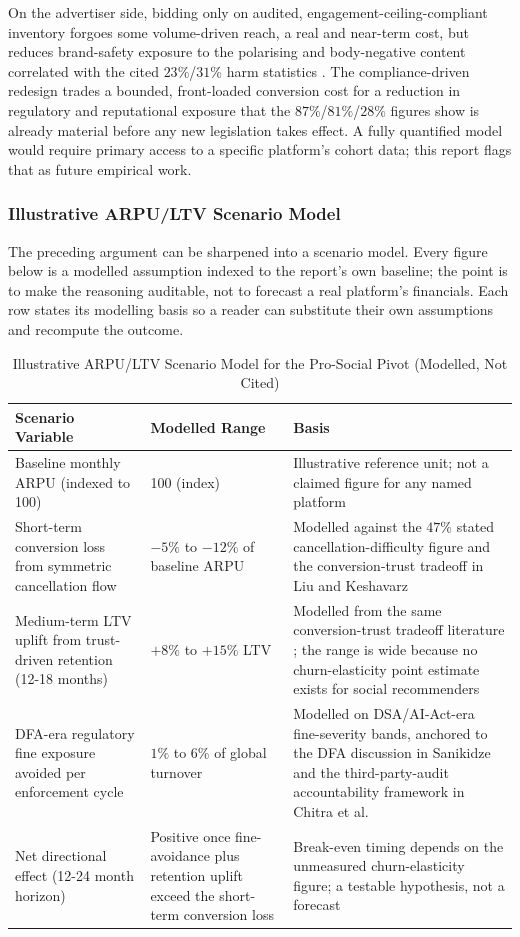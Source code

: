 \documentclass[11pt]{article}
\begin{document}
On the advertiser side, bidding only on audited, engagement-ceiling-compliant inventory forgoes some volume-driven reach, a real and near-term cost, but reduces brand-safety exposure to the polarising and body-negative content correlated with the cited $23\%$/$31\%$ harm statistics \parencites[3]{3303310}. The compliance-driven redesign trades a bounded, front-loaded conversion cost for a reduction in regulatory and reputational exposure that the $87\%$/$81\%$/$28\%$ figures show is already material before any new legislation takes effect. A fully quantified model would require primary access to a specific platform's cohort data; this report flags that as future empirical work.

\subsubsection{Illustrative ARPU/LTV Scenario Model}
The preceding argument can be sharpened into a scenario model. Every figure below is a modelled assumption indexed to the report's own baseline; the point is to make the reasoning auditable, not to forecast a real platform's financials. Each row states its modelling basis so a reader can substitute their own assumptions and recompute the outcome.

\begin{table}[H]
\centering
\caption{Illustrative ARPU/LTV Scenario Model for the Pro-Social Pivot (Modelled, Not Cited)}
\label{tab:arpu_ltv_scenario}
\begin{tabular}{p{4.3cm}p{3.8cm}p{5.4cm}}
\hline
Scenario Variable & Modelled Range & Basis \\
\hline
Baseline monthly ARPU (indexed to 100) & 100 (index) & Illustrative reference unit; not a claimed figure for any named platform \\
Short-term conversion loss from symmetric cancellation flow & $-5\%$ to $-12\%$ of baseline ARPU & Modelled against the $47\%$ stated cancellation-difficulty figure and the conversion-trust tradeoff in Liu and Keshavarz \parencites[37]{6087241} \\
Medium-term LTV uplift from trust-driven retention (12-18 months) & $+8\%$ to $+15\%$ LTV & Modelled from the same conversion-trust tradeoff literature \parencites[37]{6087241}; the range is wide because no churn-elasticity point estimate exists for social recommenders \\
DFA-era regulatory fine exposure avoided per enforcement cycle & $1\%$ to $6\%$ of global turnover & Modelled on DSA/AI-Act-era fine-severity bands, anchored to the DFA discussion in Sanikidze \parencites[390]{7896734} and the third-party-audit accountability framework in Chitra et al. \parencites[2252]{6502223} \\
Net directional effect (12-24 month horizon) & Positive once fine-avoidance plus retention uplift exceed the short-term conversion loss & Break-even timing depends on the unmeasured churn-elasticity figure; a testable hypothesis, not a forecast \\
\hline
\end{tabular}
\end{table}
\end{document}
